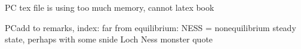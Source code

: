 {PC{ tex file is using too much memory, cannot
  latex book}

PC{add to remarks, index: far from equilibrium: NESS = nonequilibrium
  steady state, perhaps with some snide Loch Ness monster quote}

%
%
%
%
%
%
}
